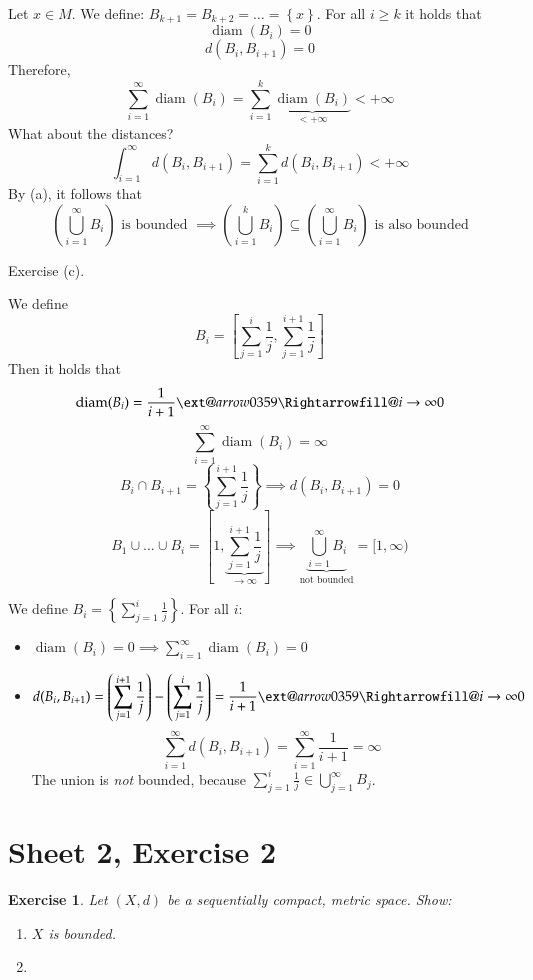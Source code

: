 \documentclass{article}
\makeatletter
\newtheorem{ex}{Exercise} %
\newcommand{\set}[1]{\left\{#1\right\}}
\newcommand{\xRightarrow}[2][]{\ext@arrow 0359\Rightarrowfill@{#1}{#2}}
\makeatother
\begin{document}
Let $x \in M$. We define: $B_{k+1} = B_{k+2} = \dots = \set{x}$.
For all $i \geq k$ it holds that
\[ \operatorname{diam}(B_i) = 0 \]
\[ d(B_i, B_{i+1}) = 0 \]
Therefore,
\[ \sum_{i=1}^\infty \operatorname{diam}(B_i) = \sum_{i=1}^k \underbrace{\operatorname{diam}(B_i)}_{<+\infty} < +\infty \]
What about the distances?
\[ \int_{i=1}^\infty d(B_i, B_{i+1}) = \sum_{i=1}^k d(B_i, B_{i+1}) < +\infty \]
By (a), it follows that
\[ \left(\bigcup_{i=1}^\infty B_i\right) \text{ is bounded } \implies \left(\bigcup_{i=1}^k B_i\right) \subseteq \left(\bigcup_{i=1}^\infty B_i\right) \text{ is also bounded}  \]

Exercise (c).

We define
\[ B_i = \left[\sum_{j=1}^i \frac1j , \sum_{j=1}^{i+1} \frac1j\right] \]
Then it holds that
\[ \operatorname{diam}(B_i) = \frac1{i+1} \xRightarrow{i\to\infty} 0 \]
\[ \sum_{i=1}^\infty \operatorname{diam}(B_i) = \infty \]
\[ B_i \cap B_{i+1} = \set{\sum_{j=1}^{i+1} \frac1j} \implies d(B_i, B_{i+1}) = 0 \]
\[ B_1 \cup \dots \cup B_i = \left[1, \underbrace{\sum_{j=1}^{i+1} \frac1j}_{\to\infty}\right] \implies \underbrace{\bigcup_{i=1}^\infty B_i}_{\text{not bounded}} = [1,\infty) \]

We define $B_i = \set{\sum_{j=1}^i \frac1{j}}$. For all $i$:
\begin{itemize}
  \item $\operatorname{diam}(B_i) = 0 \implies \sum_{i=1}^\infty \operatorname{diam}(B_i) = 0$
  \item
    \[ d(B_i, B_{i+1}) = \left(\sum_{j=1}^{i+1} \frac1j\right) - \left(\sum_{j=1}^i \frac1j\right) = \frac1{i+1} \xRightarrow{i\to\infty} 0 \]
    \[ \sum_{i=1}^\infty d(B_i, B_{i+1}) = \sum_{i=1}^\infty \frac{1}{i+1} = \infty \]
    The union is \emph{not} bounded, because $\sum_{j=1}^i \frac1j \in \bigcup_{j=1}^\infty B_j$.
\end{itemize}

\section{Sheet 2, Exercise 2}

\begin{ex}
  Let $(X, d)$ be a sequentially compact, metric space. Show:
  \begin{enumerate}
    \item[a.] $X$ is bounded.
    \item[b.]
  \end{enumerate}
\end{ex}
\end{document}
